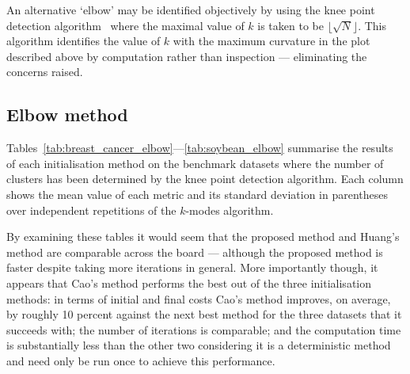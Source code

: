 An alternative `elbow' may be identified objectively by using the knee point
detection algorithm~\cite{Satopaa2011} where the maximal value of \(k\) is taken
to be \(\lfloor\sqrt{N}\rfloor\). This algorithm identifies the value of \(k\)
with the maximum curvature in the plot described above by computation rather
than inspection --- eliminating the concerns raised.

\subsection{Elbow method}\label{subsec:elbow}
\graphicspath{{./img/elbow/}}

Tables~\ref{tab:breast_cancer_elbow}---\ref{tab:soybean_elbow}
summarise the results of each initialisation method on the benchmark datasets
where the number of clusters has been determined by the knee point detection
algorithm. Each column shows the mean value of each metric and its standard
deviation in parentheses over independent
repetitions of the \(k\)-modes algorithm.

\begin{table}[htbp]
    \centering
    \resizebox{\tablewidth}{!}{%
        
    }
    \label{tab:breast_cancer_elbow}\vspace{20pt}

    \resizebox{\tablewidth}{!}{%
        
    }
    \label{tab:mushroom_elbow}\vspace{20pt}

    \resizebox{\tablewidth}{!}{%
        
    }
    \label{tab:nursery_elbow}\vspace{20pt}

    \resizebox{\tablewidth}{!}{%
        
    }
    \label{tab:soybean_elbow}
\end{table}

By examining these tables it would seem that the proposed method and Huang's
method are comparable across the board --- although the proposed method is
faster despite taking more iterations in general. More importantly though, it
appears that Cao's method performs the best out of the three initialisation
methods: in terms of initial and final costs Cao's method improves, on average,
by roughly 10 percent against the next best method for the three datasets that
it succeeds with; the number of iterations is comparable; and the computation
time is substantially less than the other two considering it is a deterministic
method and need only be run once to achieve this performance.

